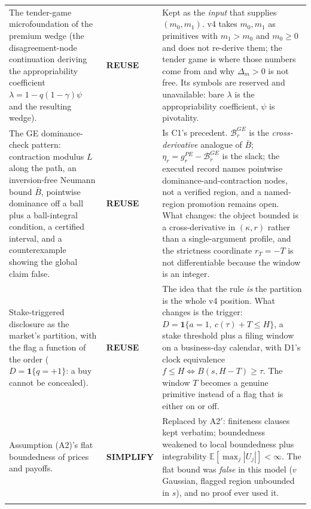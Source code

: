 \documentclass[11pt,a4paper]{article}
\newcommand{\Eop}{\mathbb{E}}
\newcommand{\ind}{\mathbf{1}}
\begin{document}
\begin{longtable}{@{}>{\raggedright\arraybackslash}p{}>{\raggedright\arraybackslash}p{}>{\raggedright\arraybackslash}p{}@{}}
The tender-game microfoundation of the premium wedge (the disagreement-node
continuation deriving the appropriability coefficient
$\lambda=1-q(1-\gamma)\psi$ and the resulting wedge). &
\textbf{REUSE} &
Kept as the \emph{input} that supplies $(m_0,m_1)$. v4 takes $m_0,m_1$ as
primitives with $m_1>m_0$ and $m_0\ge0$ and does not re-derive them; the tender game
is where those numbers come from and why $\Delta_m>0$ is not free. Its symbols are
reserved and unavailable: bare $\lambda$ is the appropriability coefficient, $\psi$
is pivotality. \\
\addlinespace

The GE dominance-check pattern: contraction modulus $L$ along the path, an
inversion-free Neumann bound $\bar B$, pointwise dominance off a ball plus a
ball-integral condition, a certified interval, and a counterexample showing the
global claim false. &
\textbf{REUSE} &
Is C1's precedent. $\mathcal B_r^{GE}$ is the \emph{cross-derivative} analogue of
$\bar B$; $\eta_r=g_r^{PE}-\mathcal B_r^{GE}$ is the slack; the executed record names
pointwise dominance-and-contraction nodes, not a verified region, and a named-region
promotion remains open. What changes: the object bounded is a cross-derivative in
$(\kappa,r)$ rather
than a single-argument profile, and the strictness coordinate $r_T=-T$ is not
differentiable because the window is an integer. \\
\addlinespace

Stake-triggered disclosure as the market's partition, with the flag a function of
the order ($D=\ind\{q=+1\}$: a buy cannot be concealed). &
\textbf{REUSE} &
The idea that the rule \emph{is} the partition is the whole v4 position. What
changes is the trigger: $D=\ind\{a=1,\ c(\tau)+T\le H\}$, a stake threshold plus a
filing window on a business-day calendar, with D1's clock equivalence
$f\le H\iff B(s,H-T)\ge\tau$. The window $T$ becomes a genuine primitive instead of a
flag that is either on or off. \\
\addlinespace

Assumption (A2)'s flat boundedness of prices and payoffs. &
\textbf{SIMPLIFY} &
Replaced by A2$'$: finiteness clauses kept verbatim; boundedness weakened to local
boundedness plus integrability $\Eop[\max_j|U_j|]<\infty$. The flat bound was
\emph{false} in this model ($v$ Gaussian, flagged region unbounded in $s$), and no
proof ever used it. \\
\addlinespace


\end{longtable}
\end{document}
